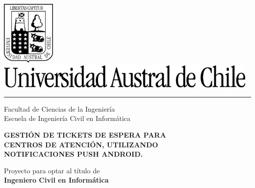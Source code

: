 \documentclass[12pt]{article}
\newcommand{\blockline}{\par\noindent\hspace{-0.05\textwidth}%
    \textcolor{black}{\rule{1.05\textwidth}{0.35mm}}\par\nobreak}
\begin{document}

\thispagestyle{empty}
\setcounter{page}{1}
\begin{spacing}{1.0}

\begin{center}
\includegraphics[width=2.65cm, height=3.18cm]{images/portada/escudo.png}\\
\vspace{0.5cm}
\includegraphics[width=13.02cm, height=1.23cm]{images/portada/uach.png}\\
\vspace{-0.4cm}
\blockline
\vspace{0.2cm}
{\fontsize{24}{24}\selectfont Facultad de Ciencias de la Ingeniería}\\[0.1cm]
{\fontsize{18}{18}\selectfont Escuela de Ingeniería Civil en Informática}\\
\end{center}

\vspace{2.0cm}

\begin{center}
	{\fontsize{18}{18}\selectfont \bf GESTIÓN DE TICKETS DE ESPERA PARA}\\[0.2cm]
	{\fontsize{18}{18}\selectfont \bf CENTROS DE ATENCIÓN, UTILIZANDO}\\[0.2cm]
	{\fontsize{18}{18}\selectfont \bf NOTIFICACIONES PUSH ANDROID.}\\[0.2cm]   
	
\end{center}

\vspace{2.0cm}

\begin{flushright} \small
{\fontsize{10}{10}\selectfont Proyecto para optar al título de}  \textcolor{white}{.}\\
{\fontsize{10}{10}\selectfont \bf Ingeniero Civil en Informática} 
\end{flushright}


\end{spacing}
\end{document}
